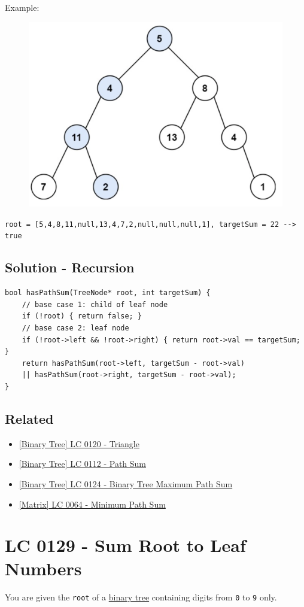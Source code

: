 Example:
\begin{figure}[H]
	\centering
	\includegraphics[width=0.5\linewidth]{images/lc0112}
	\label{fig:lc0112}
\end{figure}
{\colorbox{CodeBackground}{\lstinline|root = [5,4,8,11,null,13,4,7,2,null,null,null,1], targetSum = 22 --> true|}}

\subsection*{Solution - Recursion}
\begin{lstlisting}
bool hasPathSum(TreeNode* root, int targetSum) {
	// base case 1: child of leaf node
	if (!root) { return false; }
	// base case 2: leaf node
	if (!root->left && !root->right) { return root->val == targetSum; }
	return hasPathSum(root->left, targetSum - root->val)
	|| hasPathSum(root->right, targetSum - root->val);
}
\end{lstlisting}

\subsection*{Related}
\begin{itemize}
	\item \hyperref[lc0120]{[Binary Tree] LC 0120 - Triangle}
	\item \hyperref[lc0112]{[Binary Tree] LC 0112 - Path Sum}
	\item \hyperref[lc0124]{[Binary Tree] LC 0124 - Binary Tree Maximum Path Sum}
	\item \hyperref[lc0064]{[Matrix] LC 0064 - Minimum Path Sum}
\end{itemize}

\section{LC 0129 - Sum Root to Leaf Numbers}
You are given the {\colorbox{CodeBackground}{\lstinline|root|}} of a \ul{binary tree} containing digits from {\colorbox{CodeBackground}{\lstinline|0|}} to {\colorbox{CodeBackground}{\lstinline|9|}} only.\\

